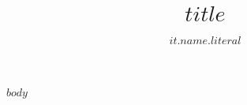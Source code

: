 \documentclass[$if(fontsize)$
$fontsize$,
$endif$
$if(papersize)$
$papersize$paper,
$endif$
$for(classoption)$
$classoption$$sep$,
$endfor$]{rackham}
\title{$title$}
\author{$it.name.literal$}
\begin{document}
$body$
\end{document}
